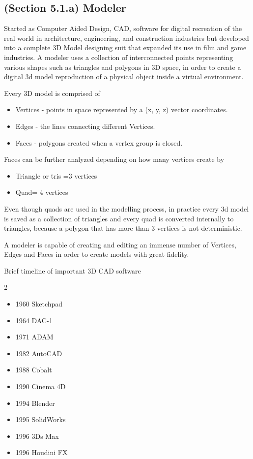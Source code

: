 \documentclass[a4paper,one side,12pt]{book}
\begin{document}
\subsection{(Section 5.1.a) Modeler}

Started as Computer Aided Design, CAD, software for digital recreation
of the real world in architecture, engineering, and construction
industries but developed into a complete 3D Model designing suit that
expanded it\textquotesingle s use in film and game industries. A modeler
uses a collection of interconnected points representing various shapes
such as triangles and polygons in 3D space, in order to create a digital
3d model reproduction of a physical object inside a virtual environment.

Every 3D model is comprised of

\begin{itemize}
\item
  Vertices - points in space represented by a (x, y, z) vector
  coordinates.
\item
  Edges - the lines connecting different Vertices.
\item
  Faces - polygons created when a vertex group is closed.
\end{itemize}

Faces can be further analyzed depending on how many vertices create by

\begin{itemize}
\item
  Triangle or tris =3 vertices
\item
  Quad= 4 vertices
\end{itemize}

Even though quads are used in the modelling process, in practice every
3d model is saved as a collection of triangles and every quad is
converted internally to triangles, because a polygon that has more than
3 vertices is not deterministic.

A modeler is capable of creating and editing an immense number of
Vertices, Edges and Faces in order to create models with great fidelity.

Brief timeline of important 3D CAD software

\begin{multicols}{2}
  \begin{itemize}
    \item 	1960 Sketchpad 
    \item   1964 DAC-1
    \item	  1971 ADAM
    \item	  1982 AutoCAD
    \item	  1988 Cobalt	
    \item   1990 Cinema 4D
    \item	  1994 Blender
    \item	  1995 SolidWorks
    \item	  1996 3Ds Max
    \item 	1996 Houdini FX
    
  \end{itemize}
\end{multicols}
\end{document}
